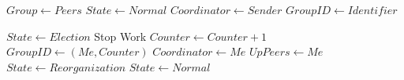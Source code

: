 \begin{algorithmic}[1]
\State

        \State $Group \gets Peers$
        \State $State \gets Normal$
		\State $Coordinator \gets Sender$
		\State $GroupID \gets Identifier$
    \EndIf
\EndFunction

\State

    \State $State \gets Election$
    \State Stop Work
    \State $Counter \gets Counter + 1$
    \State $GroupID \gets (Me,Counter)$
    \State $Coordinator \gets Me$
    \State $UpPeers \gets {Me}$
    \State $State \gets Reorganization$
    \State $State \gets Normal$
\EndFunction

\end{algorithmic}

